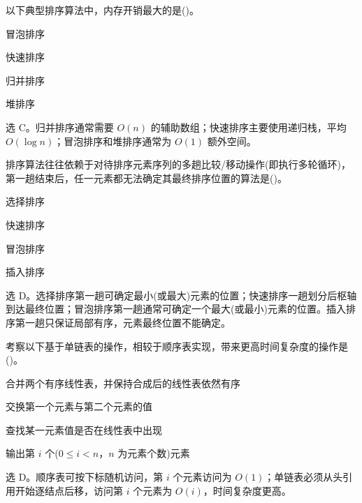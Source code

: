 \begin{question}
以下典型排序算法中，内存开销最大的是(\quad)。
\begin{choiceoptions}[2]
  \item 冒泡排序
  \item 快速排序
  \item 归并排序
  \item 堆排序
\end{choiceoptions}
\begin{solution}
选 C。归并排序通常需要 $O(n)$ 的辅助数组；快速排序主要使用递归栈，平均 $O(\log n)$；冒泡排序和堆排序通常为 $O(1)$ 额外空间。
\end{solution}
\end{question}

\begin{question}
排序算法往往依赖于对待排序元素序列的多趟比较/移动操作(即执行多轮循环)，第一趟结束后，任一元素都无法确定其最终排序位置的算法是(\quad)。
\begin{choiceoptions}[2]
  \item 选择排序
  \item 快速排序
  \item 冒泡排序
  \item 插入排序
\end{choiceoptions}
\begin{solution}
选 D。选择排序第一趟可确定最小(或最大)元素的位置；快速排序一趟划分后枢轴到达最终位置；冒泡排序第一趟通常可确定一个最大(或最小)元素的位置。插入排序第一趟只保证局部有序，元素最终位置不能确定。
\end{solution}
\end{question}

\begin{question}
考察以下基于单链表的操作，相较于顺序表实现，带来更高时间复杂度的操作是(\quad)。
\begin{choiceoptions}[1]
  \item 合并两个有序线性表，并保持合成后的线性表依然有序
  \item 交换第一个元素与第二个元素的值
  \item 查找某一元素值是否在线性表中出现
  \item 输出第 $i$ 个($0\le i<n$，$n$ 为元素个数)元素
\end{choiceoptions}
\begin{solution}
选 D。顺序表可按下标随机访问，第 $i$ 个元素访问为 $O(1)$；单链表必须从头引用开始逐结点后移，访问第 $i$ 个元素为 $O(i)$，时间复杂度更高。
\end{solution}
\end{question}

